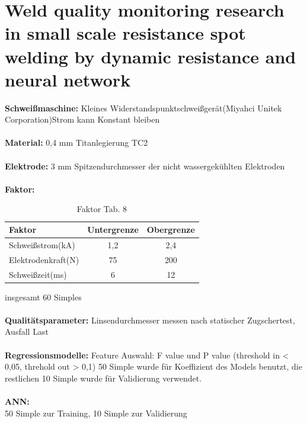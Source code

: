 \documentclass[english,ngerman]{tudscrreprt}
\begin{document}
\section{Weld quality monitoring research in small scale resistance spot welding by dynamic resistance and neural network\cite{Wan.2017}}
\textbf{Schweißmaschine: }Kleines Widerstandspunktschweißgerät(Miyahci Unitek Corporation)Strom kann Konstant bleiben \\
\\
\textbf{Material: }0,4 mm Titanlegierung TC2\\
\\
\textbf{Elektrode: }3 mm Spitzendurchmesser der nicht wassergekühlten Elektroden\\
\\
\textbf{Faktor: }\\
\begin{table}[H]
\caption{Faktor Tab. 8}
\begin{flushleft}
	\begin{tabular}{lcc} 
		\toprule
 		\textbf{Faktor} & \textbf{Untergrenze} & \textbf{Obergrenze}\\
		\midrule
		Schweißstrom(kA) & 1,2 & 2,4\\

		Elektrodenkraft(N) & 75 & 200\\

		Schweißzeit(ms) & 6  & 12 \\
		\bottomrule
	\end{tabular}
\end{flushleft}
\end{table}
insgesamt 60 Simples\\
\\
\textbf{Qualitätsparameter: }Linsendurchmesser messen nach statischer Zugschertest, Ausfall Last\\
\\
\textbf{Regressionsmodelle: }
Feature Auswahl: F value und P value (threshold in < 0,05, threhold out > 0,1) 50 Simple wurde für Koeffizient des Models benutzt, die restlichen 10 Simple wurde für Validierung verwendet.\\ 
\\
\textbf{ANN: }\\
50 Simple zur Training, 10 Simple zur Validierung
\end{document}
